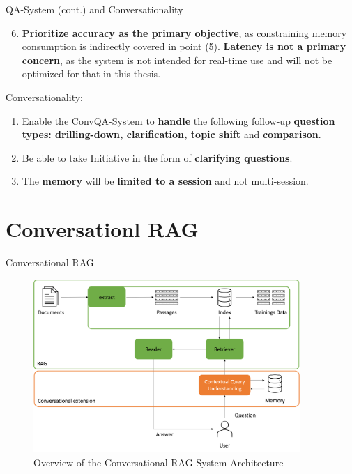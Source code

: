 \documentclass{beamer}
\begin{document}
\begin{frame}{QA-System (cont.) and Conversationality}
  \begin{enumerate}
    \setcounter{enumi}{5}
    \item \textbf{Prioritize accuracy as the primary objective}, as constraining memory consumption is indirectly covered in point (5). \textbf{Latency is not a primary concern}, as the system is not intended for real-time use and will not be optimized for that in this thesis.
  \end{enumerate}
  
  Conversationality:
  \begin{enumerate}
    \item Enable the ConvQA-System to \textbf{handle} the following follow-up \textbf{question types: drilling-down, clarification, topic shift} and \textbf{comparison}.
    \item Be able to take Initiative in the form of \textbf{clarifying questions}.
    \item The \textbf{memory} will be \textbf{limited to a session} and not multi-session.
  \end{enumerate}
\end{frame}



\section[ConRAG]{Conversationl RAG}

\begin{frame}{Conversational RAG}

  \vfill
  \begin{figure}
    \includegraphics[width=0.9\textwidth]{Grafiken/System_Architecture.png}
    \caption{Overview of the Conversational-RAG System Architecture}
  \end{figure}
  \vfill

\end{frame}
\end{document}
